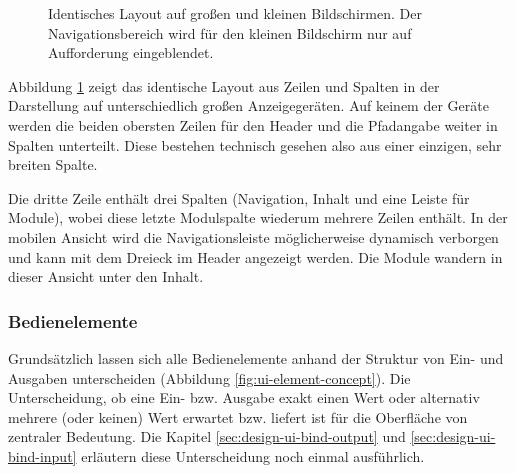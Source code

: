 \begin{figure}[p]
  \begin{center}
  \end{center}
  \caption{Identisches Layout auf großen und kleinen Bildschirmen. Der Navigationsbereich wird für den kleinen Bildschirm nur auf Aufforderung eingeblendet.}
  \label{fig:grid-example}
\end{figure}

Abbildung \ref{fig:grid-example} zeigt das identische Layout aus Zeilen und Spalten in der Darstellung auf unterschiedlich großen Anzeigegeräten. Auf keinem der Geräte werden die beiden obersten Zeilen für den Header und die Pfadangabe weiter in Spalten unterteilt. Diese bestehen technisch gesehen also aus einer einzigen, sehr breiten Spalte.

Die dritte Zeile enthält drei Spalten (Navigation, Inhalt und eine Leiste für Module), wobei diese letzte Modulspalte wiederum mehrere Zeilen enthält. In der mobilen Ansicht wird die Navigationsleiste möglicherweise dynamisch verborgen und kann mit dem Dreieck im Header angezeigt werden. Die Module wandern in dieser Ansicht unter den Inhalt.

\subsubsection{Bedienelemente}

Grundsätzlich lassen sich alle Bedienelemente anhand der Struktur von Ein- und Ausgaben unterscheiden (Abbildung \ref{fig:ui-element-concept}). Die Unterscheidung, ob eine Ein- bzw. Ausgabe exakt einen Wert oder alternativ mehrere (oder keinen) Wert erwartet bzw. liefert ist für die Oberfläche von zentraler Bedeutung. Die Kapitel \ref{sec:design-ui-bind-output}  und \ref{sec:design-ui-bind-input}  erläutern diese Unterscheidung noch einmal ausführlich.

